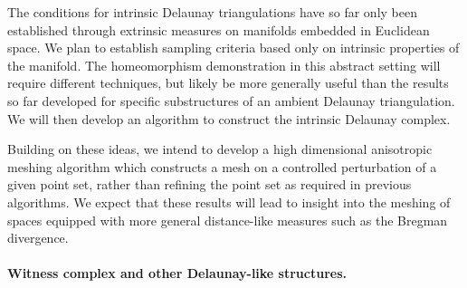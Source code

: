 The conditions for intrinsic Delaunay triangulations have so far only
been established through extrinsic measures on manifolds embedded in
Euclidean space. We plan to establish sampling criteria based only on
intrinsic properties of the manifold. The homeomorphism demonstration
in this abstract setting will require different techniques, but likely
be more generally useful than the results so far developed for
specific substructures of an ambient Delaunay triangulation.  We will
then develop an algorithm to construct the intrinsic Delaunay complex.

Building on these ideas, we intend to develop a high dimensional
anisotropic meshing algorithm which constructs a mesh on a controlled
perturbation of a given point set, rather than refining the point set
as required in previous algorithms. We expect that these results will
lead to insight into the meshing of spaces equipped with more general
distance-like measures such as the Bregman divergence.

\paragraph{Witness complex and other Delaunay-like structures.}

